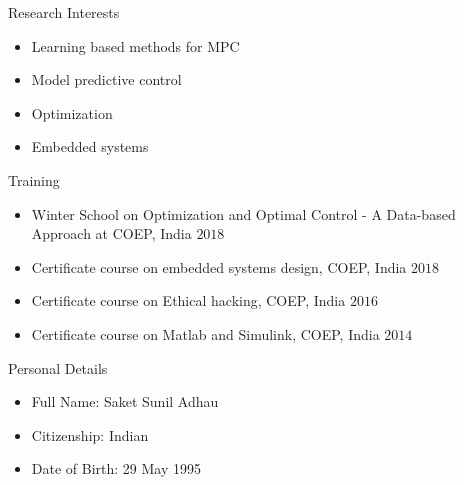 \documentclass[11pt]{resume}
\newenvironment{outerlist}[1][\enskip\textbullet]%
{\begin{itemize}[#1,leftmargin=*]}{\end{itemize}%
	\vspace{-.5\baselineskip}}
\begin{document}
\begin{rSection}{Research Interests}
	\begin{outerlist}       
	    \item Learning based methods for MPC
        \item Model predictive control
        \item Optimization
		\item Embedded systems
	\end{outerlist} 
\end{rSection}
\begin{rSection}{Training}
	\begin{outerlist}
		\item Winter School on Optimization and Optimal Control - A Data-based Approach at COEP, India \hfill $ 2018 $
		
		\item Certificate course on embedded systems design, COEP, India \hfill $ 2018 $
		
		\item Certificate course on Ethical hacking, COEP, India \hfill $ 2016 $
		\item Certificate course on Matlab and Simulink, COEP, India \hfill $ 2014 $
		
	\end{outerlist}
\end{rSection}
\begin{rSection}{Personal Details}
	\begin{outerlist}
		\item Full Name: Saket Sunil Adhau
		\item Citizenship: Indian
		\item Date of Birth: 29 May 1995 
	\end{outerlist}
\end{rSection}
\end{document}
